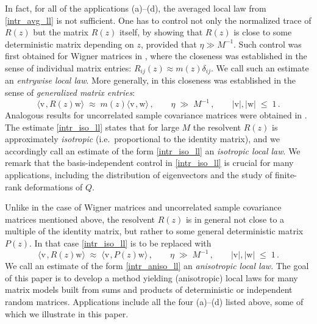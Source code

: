 \documentclass[11pt]{article} %
\numberwithin{equation}{section}
\numberwithin{figure}{section}
\theoremstyle{plain} %
\theoremstyle{definition} %
\newcommand{\f}[1]{\boldsymbol{\mathrm{#1}}} %
\renewcommand{\leq}{\leqslant}
\newcommand{\abs}[1]{\lvert #1 \rvert}
\newcommand{\scalar}[2]{\langle{#1} \mspace{2mu}, {#2}\rangle}
\begin{document}
In fact, for all of the applications (a)--(d), the averaged local law from \eqref{intr_avg_ll} is not sufficient. One has to control not only the normalized trace of $R(z)$ but the matrix $R(z)$ itself, by showing that $R(z)$ is close to some deterministic matrix depending on $z$, provided that $\eta \gg M^{-1}$. Such control was first obtained for Wigner matrices in \cite{EYY1}, where the closeness was established in the sense of individual matrix entries: $R_{ij}(z) \approx m(z) \delta_{ij}$. We call such an estimate an \emph{entrywise local law}. More generally, in \cite{KY2, BEKYY} this closeness was established in the sense of \emph{generalized matrix entries}:
\begin{equation} \label{intr_iso_ll}
\scalar{\f v}{R(z) \f w} \;\approx\; m(z) \scalar{\f v}{\f w}\,, \qquad \eta \;\gg\; M^{-1}\,, \qquad \abs{\f v}, \abs{\f w} \;\leq\; 1\,.
\end{equation}
Analogous results for uncorrelated sample covariance matrices were obtained in \cite{PY, BEKYY}. The estimate \eqref{intr_iso_ll} states that for large $M$ the resolvent $R(z)$ is approximately \emph{isotropic} (i.e.\ proportional to the identity matrix), and we accordingly call an estimate of the form \eqref{intr_iso_ll} an \emph{isotropic local law}. We remark that the basis-independent control in \eqref{intr_iso_ll} is crucial for many applications, including the distribution of eigenvectors and the study of finite-rank deformations of $Q$.

Unlike in the case of Wigner matrices and uncorrelated sample covariance matrices mentioned above, the resolvent $R(z)$ is in general not close to a multiple of the identity matrix, but rather to some general deterministic matrix $P(z)$. In that case \eqref{intr_iso_ll} is to be replaced with
\begin{equation} \label{intr_aniso_ll}
\scalar{\f v}{R(z) \f w} \;\approx\; \scalar{\f v}{P(z) \f w}\,, \qquad \eta \;\gg\; M^{-1}\,, \qquad \abs{\f v}, \abs{\f w} \;\leq\; 1\,.
\end{equation}
We call an estimate of the form \eqref{intr_aniso_ll} an \emph{anisotropic local law}. The goal of this paper is to develop a method yielding (anisotropic) local laws for many matrix models built from sums and products of deterministic or independent random matrices. Applications include all the four (a)--(d) listed above, some of which we illustrate in this paper.
\end{document}
